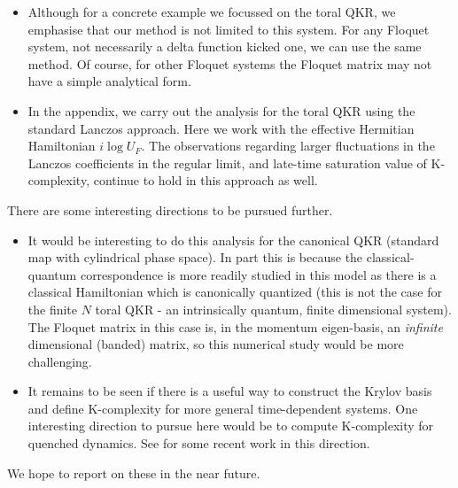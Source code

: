 \documentclass[a4paper,12pt]{article}
\begin{document}
\begin{itemize}
\item Although for a concrete example we focussed on the toral QKR, we emphasise that our method is not limited to this system. For any Floquet system, not necessarily a delta function kicked one, we can use the same method. Of course, for other Floquet systems the Floquet matrix may not have a simple analytical form.

\item In the appendix, we carry out the analysis for the toral QKR using the standard Lanczos approach. Here we work with the effective Hermitian Hamiltonian $i \log U_F$. The observations regarding larger fluctuations in the Lanczos coefficients in the regular limit, and late-time saturation value of K-complexity, continue to hold in this approach as well.
\end{itemize}
There are some interesting directions to be pursued further.

\begin{itemize}
\item
It would be interesting to do this analysis for the canonical QKR (standard map with cylindrical phase space). In part this is because the classical-quantum correspondence is more readily studied in this model as there is a classical Hamiltonian which is canonically quantized (this is not the case for the finite $N$ toral QKR - an intrinsically quantum, finite dimensional system). The Floquet matrix in this case is, in the momentum eigen-basis, an {\it infinite} dimensional (banded) matrix, so this numerical study would be more challenging.

\item 
It remains to be seen if there is a useful way to construct the Krylov basis and define K-complexity for more general time-dependent systems. One interesting direction to pursue here would be to compute K-complexity for quenched dynamics. See \cite{Afrasiar:2022efk, Pal:2023yik, Gautam:2023pny} for some recent work in this direction.
\end{itemize}

We hope to report on these in the near future.

\end{document}
